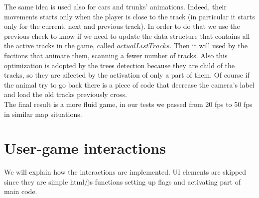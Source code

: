 \documentclass[a4paper, 11pt]{article}
\begin{document}
The same idea is used also for cars and trunks' animations. Indeed, their movements starts only when the player is close to the track (in particular it starts only for the current, next and previous track). In order to do that we use the previous check to know if we need to update the data structure that contains all the active tracks in the game, called $actualListTracks$. Then it will used by the fuctions that animate them, scanning a fewer number of tracks. Also this optimization is adopted by the trees detection because they are child of the tracks, so they are affected by the activation of only a part of them. 
Of course if the animal try to go back there is a piece of code that decrease the camera's label and load the old tracks previously cross. \\

The final result is a more fluid game, in our tests we passed from 20 fps to 50 fps in similar map situations. 


\section{User-game interactions}
We will explain how the interactions are implemented. UI elements are skipped since they are simple html/js functions setting up flags and activating part of main code.
\end{document}
